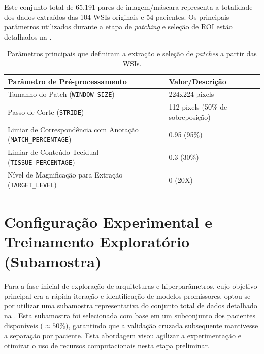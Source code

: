 Este conjunto total de 65.191 pares de imagem/máscara representa a totalidade dos dados extraídos das 104 WSIs originais e 54 pacientes. Os principais parâmetros utilizados durante a etapa de \textit{patching} e seleção de ROI estão detalhados na .

\begin{table}[!htb]
\centering
\caption[Parâmetros chave do pré-processamento e geração de \textit{patches}.]{Parâmetros principais que definiram a extração e seleção de \textit{patches} a partir das WSIs.}
\label{tab:parametros_preproc_patches}
\begin{tabular}{l p{}} %
\toprule
\textbf{Parâmetro de Pré-processamento} & \textbf{Valor/Descrição} \\
\midrule
Tamanho do Patch (\texttt{WINDOW\_SIZE}) & 224x224 pixels \\
Passo de Corte (\texttt{STRIDE}) & 112 pixels (50\% de sobreposição) \\
Limiar de Correspondência com Anotação (\texttt{MATCH\_PERCENTAGE}) & 0.95 (95\%) \\
Limiar de Conteúdo Tecidual (\texttt{TISSUE\_PERCENTAGE}) & 0.3 (30\%) \\
Nível de Magnificação para Extração (\texttt{TARGET\_LEVEL}) & 0 (20X) \\
\bottomrule
\end{tabular}
\end{table}

\section{Configuração Experimental e Treinamento Exploratório (Subamostra)}\label{sec:res_config_exp_exploratoria_subamostra} 

Para a fase inicial de exploração de arquiteturas e hiperparâmetros, cujo objetivo principal era a rápida iteração e identificação de modelos promissores, optou-se por utilizar uma subamostra representativa do conjunto total de dados detalhado na . Esta subamostra foi selecionada com base em um subconjunto dos pacientes disponíveis ($\approx 50\%$), garantindo que a validação cruzada subsequente mantivesse a separação por paciente. Esta abordagem visou agilizar a experimentação e otimizar o uso de recursos computacionais nesta etapa preliminar.

